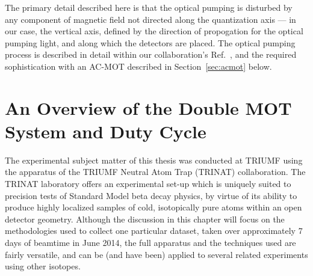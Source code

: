 The primary detail described here is that the optical pumping is disturbed by any component of magnetic field not directed along the quantization axis --- in our case, the vertical axis, defined by the direction of propogation for the optical pumping light, and along which the detectors are placed.  The optical pumping process is described in detail within our collaboration's Ref.~\cite{ben_OP}, and the required sophistication with an AC-MOT described in Section~\ref{sec:acmot} below.


\section{An Overview of the Double MOT System and Duty Cycle}
\label{section:overview}
\label{experimental_chapter}
\label{setup_chapter}
%



The experimental subject matter of this thesis was conducted at TRIUMF using the apparatus of the TRIUMF Neutral Atom Trap (TRINAT) collaboration.  The TRINAT laboratory offers an experimental set-up which is uniquely suited to precision tests of Standard Model beta decay physics, by virtue of its ability to produce highly localized samples of cold, isotopically pure atoms within an open detector geometry.    Although the discussion in this chapter will focus on the methodologies used to collect one particular dataset, taken over approximately 7 days of beamtime in June 2014, the full apparatus and the techniques used are fairly versatile, and can be (and have been) applied to
several related experiments using other isotopes.

